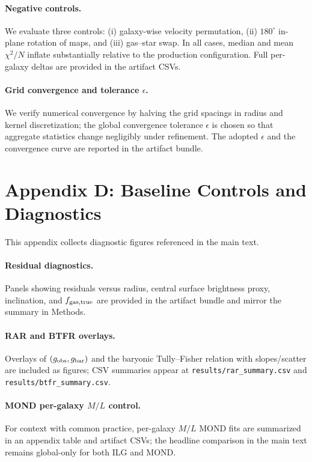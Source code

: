 \documentclass[usenatbib]{mnras}
\begin{document}
\paragraph{Negative controls.}
We evaluate three controls: (i) galaxy-wise velocity permutation, (ii) $180^\circ$ in-plane rotation of maps, and (iii) gas–star swap. In all cases, median and mean $\chi^2/N$ inflate substantially relative to the production configuration. Full per-galaxy deltas are provided in the artifact CSVs.

\paragraph{Grid convergence and tolerance $\epsilon$.}
We verify numerical convergence by halving the grid spacings in radius and kernel discretization; the global convergence tolerance $\epsilon$ is chosen so that aggregate statistics change negligibly under refinement. The adopted $\epsilon$ and the convergence curve are reported in the artifact bundle.

\section*{Appendix D: Baseline Controls and Diagnostics}
\noindent
This appendix collects diagnostic figures referenced in the main text.

\paragraph{Residual diagnostics.} Panels showing residuals versus radius, central surface brightness proxy, inclination, and $f_{\rm gas,true}$ are provided in the artifact bundle and mirror the summary in Methods.

\paragraph{RAR and BTFR overlays.} Overlays of $(g_{\rm obs},g_{\rm bar})$ and the baryonic Tully–Fisher relation with slopes/scatter are included as figures; CSV summaries appear at \texttt{results/rar\_summary.csv} and \texttt{results/btfr\_summary.csv}.

\paragraph{MOND per-galaxy $M/L$ control.} For context with common practice, per-galaxy $M/L$ MOND fits are summarized in an appendix table and artifact CSVs; the headline comparison in the main text remains global-only for both ILG and MOND.
\end{document}
